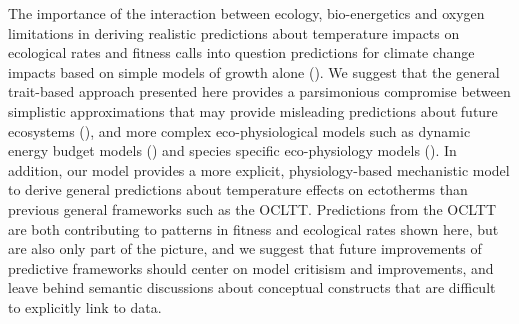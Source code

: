 \documentclass[11pt]{article}\usepackage[]{graphicx}\usepackage[]{color}
\begin{document}
The importance of the interaction between ecology, bio-energetics and oxygen limitations in deriving realistic predictions about temperature impacts on ecological rates and fitness calls into question predictions for climate change impacts based on simple models of growth alone (\cite{cheung_shrinking_2013, pauly_sound_2017}). We suggest that the general trait-based approach presented here provides a parsimonious compromise between simplistic approximations that may provide misleading predictions about future ecosystems (\cite{brander_overconfidence_2013, lefevre_models_2017}), and more complex eco-physiological models such as dynamic energy budget models (\cite[e.g., ][]{guiet_effects_2016}) and species specific eco-physiology models (\cite{hufnagl_physiological_2011, holt_climate_2014,holt_climate_2015}). In addition, our model provides a more explicit, physiology-based mechanistic model to derive general predictions about temperature effects on ectotherms than previous general frameworks such as the OCLTT. Predictions from the OCLTT are both contributing to patterns in fitness and ecological rates shown here, but are also only part of the picture, and we suggest that future improvements of predictive frameworks should center on model critisism and improvements, and leave behind semantic discussions about conceptual constructs that are difficult to explicitly link to data.

% 

\newpage{}

\renewcommand{\theequation}{\thesection-\arabic{equation}}
\renewcommand{\thetable}{\thesection-\arabic{table}}
\renewcommand{\thefigure}{\thesection-\arabic{figure}}
\setcounter{figure}{0}  %
\setcounter{table}{0}  %
\setcounter{equation}{0}  %
\end{document}
